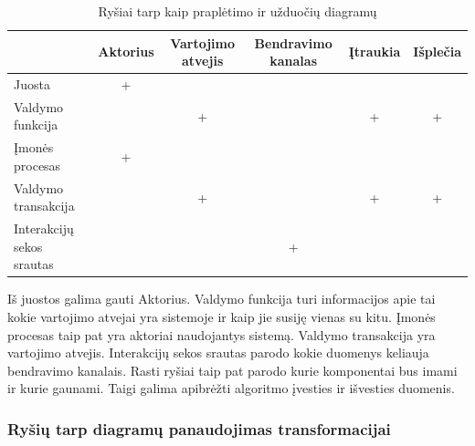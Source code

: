 \begin{center}
    \begin{longtable}{ | l | c |  c | c | c | c |}
    \caption{Ryšiai tarp \DVCM{} kaip \BPMN{} praplėtimo ir užduočių diagramų}
	\label{tab:relations_sd_bpmn}
    \\ \hline
     &
     Aktorius
     &
     Vartojimo atvejis
     &
     Bendravimo kanalas
     &
     Įtraukia
     &
     Išplečia
     \\
    \hline
    Juosta & + & &  &  &  \\
    \hline
    Valdymo funkcija  & & + &  & + & + \\
    \hline
    Įmonės procesas  & + &  &  &  &  \\
    \hline
    Valdymo transakcija & & + & & + & + \\
    \hline
    Interakcijų sekos srautas  & &  & + & & \\
    \hline
    \end{longtable}
\end{center}

Iš juostos galima gauti Aktorius. Valdymo funkcija turi informacijos apie tai kokie vartojimo atvejai yra sistemoje ir kaip jie susiję vienas su kitu. Įmonės procesas taip pat yra aktoriai naudojantys sistemą. Valdymo transakcija yra vartojimo atvejis. Interakcijų sekos srautas parodo kokie duomenys keliauja bendravimo kanalais. Rasti ryšiai taip pat parodo kurie komponentai bus imami ir kurie gaunami. Taigi galima apibrėžti algoritmo įvesties ir išvesties duomenis.

\subsubsection{Ryšių tarp diagramų panaudojimas transformacijai}


